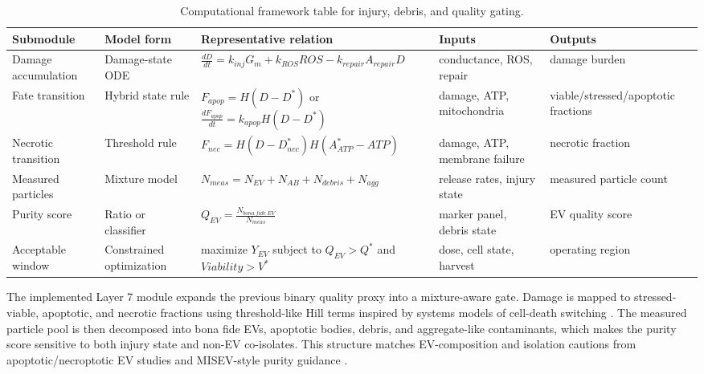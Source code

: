 \begin{table}[t]
\footnotesize\sf
\centering
\caption{Computational framework table for injury, debris, and quality gating.\label{T_A14_comp_quality_gate}}
\begin{tabular}{p{2.6cm} p{3.0cm} p{4.6cm} p{2.8cm} p{2.8cm}}
\toprule
\textbf{Submodule} & \textbf{Model form} & \textbf{Representative relation} & \textbf{Inputs} & \textbf{Outputs} \\
\midrule
Damage accumulation & Damage-state ODE \cite{pakhomova2012oxidative,bhattacharya2022calcium,albeck2008modeling} & $\frac{dD}{dt}=k_{inj}G_m+k_{ROS}ROS-k_{repair}A_{repair}D$ & conductance, ROS, repair & damage burden \\
Fate transition & Hybrid state rule \cite{albeck2008modeling,bentele2004mathematical,pakhomova2013two} & $F_{apop}=H(D-D^*)$ or $\frac{dF_{apop}}{dt}=k_{apop}H(D-D^*)$ & damage, ATP, mitochondria & viable/stressed/apoptotic fractions \\
Necrotic transition & Threshold rule \cite{pakhomova2013two,cappe2023systematic} & $F_{nec}=H(D-D_{nec}^*)H(A_{ATP}^*-ATP)$ & damage, ATP, membrane failure & necrotic fraction \\
Measured particles & Mixture model \cite{cappe2023systematic,webber2013pure,brennan2020comparison} & $N_{meas}=N_{EV}+N_{AB}+N_{debris}+N_{agg}$ & release rates, injury state & measured particle count \\
Purity score & Ratio or classifier \cite{webber2013pure,brennan2020comparison,welsh2024minimal} & $Q_{EV}=\frac{N_{bona\ fide\ EV}}{N_{meas}}$ & marker panel, debris state & EV quality score \\
Acceptable window & Constrained optimization \cite{orlacchio2023effects,gudvangen2022electroporation,welsh2024minimal} & maximize $Y_{EV}$ subject to $Q_{EV}>Q^*$ and $Viability>V^*$ & dose, cell state, harvest & operating region \\
\bottomrule
\end{tabular}
\end{table}


The implemented Layer 7 module expands the previous binary quality proxy into a mixture-aware gate. Damage is mapped to stressed-viable, apoptotic, and necrotic fractions using threshold-like Hill terms inspired by systems models of cell-death switching \cite{albeck2008modeling,bentele2004mathematical}. The measured particle pool is then decomposed into bona fide EVs, apoptotic bodies, debris, and aggregate-like contaminants, which makes the purity score sensitive to both injury state and non-EV co-isolates. This structure matches EV-composition and isolation cautions from apoptotic/necroptotic EV studies and MISEV-style purity guidance \cite{cappe2023systematic,webber2013pure,brennan2020comparison,welsh2024minimal}.

